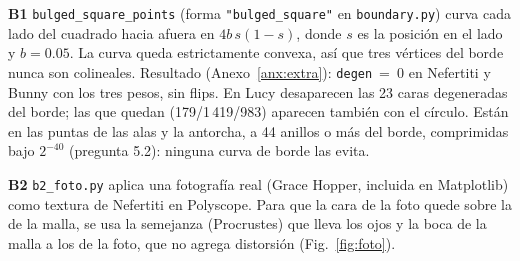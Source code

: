 \documentclass[
	spanish, %
	a4paper, oneside
]{article}
\newcommand{\code}[1]{\texttt{#1}}
\newcommand{\preg}[1]{\textbf{#1}\enspace}
\begin{document}
\preg{B1} \code{bulged\_square\_points} (forma \code{"bulged\_square"} en \code{boundary.py}) curva cada lado del cuadrado hacia afuera en $4b\,s(1-s)$, donde $s$ es la posición en el lado y $b=0.05$. La curva queda estrictamente convexa, así que tres vértices del borde nunca son colineales. Resultado (Anexo~\ref{anx:extra}): \code{degen}~=~0 en Nefertiti y Bunny con los tres pesos, sin flips. En Lucy desaparecen las 23 caras degeneradas del borde; las que quedan (179/1\,419/983) aparecen también con el círculo. Están en las puntas de las alas y la antorcha, a 44 anillos o más del borde, comprimidas bajo $2^{-40}$ (pregunta 5.2): ninguna curva de borde las evita.

\preg{B2} \code{b2\_foto.py} aplica una fotografía real (Grace Hopper, incluida en Matplotlib) como textura de Nefertiti en Polyscope. Para que la cara de la foto quede sobre la de la malla, se usa la semejanza (Procrustes) que lleva los ojos y la boca de la malla a los de la foto, que no agrega distorsión (Fig.~\ref{fig:foto}).
\end{document}
